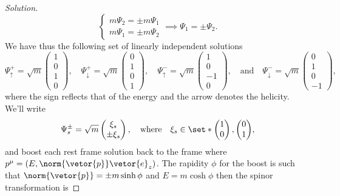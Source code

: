 \begin{proof}[Solution]
\begin{equation*}
\begin{cases}
         m \Psi_2 = \pm m \Psi_1\\
         m \Psi_1 = \pm m \Psi_2
      \end{cases} \implies \Psi_1 = \pm \Psi_2.
   \end{equation*}
   We have thus the following set of linearly independent solutions
   \begin{equation*}
      \Psi^+_\uparrow = \sqrt{m} \begin{pmatrix}
         1 \\ 0\\1 \\ 0
      \end{pmatrix},
      \quad
      \Psi^+_\downarrow = \sqrt{m} \begin{pmatrix}
         0 \\ 1\\0 \\ 1
      \end{pmatrix},
      \quad
      \Psi^-_\uparrow = \sqrt{m} \begin{pmatrix}
         1 \\ 0\\-1 \\ 0
      \end{pmatrix},
      \quad\text{and}\quad
      \Psi^-_\downarrow = \sqrt{m} \begin{pmatrix}
         0 \\ 1\\0 \\-1
      \end{pmatrix},
   \end{equation*}
   where the sign reflects that of the energy and the arrow denotes the helicity. We'll write
   \begin{equation*}
      \Psi^\pm_{s} = \sqrt{m}\begin{pmatrix} \xi_s\\\pm\xi_s \end{pmatrix},\quad\text{where}\quad \xi_s \in \set*{\begin{pmatrix} 1 \\0 \end{pmatrix}, \begin{pmatrix} 0\\1 \end{pmatrix}},
   \end{equation*}
   and boost each rest frame solution back to the frame where \(p^\mu = (E, \norm{\vetor{p}} \vetor{e}_z)\). The rapidity \(\phi\) for the boost is such that \(\norm{\vetor{p}} = \pm m \sinh\phi\) and \(E = m \cosh\phi\) then the spinor transformation is

\end{proof}
